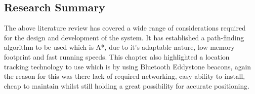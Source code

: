 \subsection{Research Summary}
The above literature review has covered a wide range of considerations required for the design and development of the system. It has established a path-finding algorithm to be used which is A*, due to it's adaptable nature, low memory footprint and fast running speeds. This chapter also highlighted a location tracking technology to use which is by using Bluetooth Eddystone beacons, again the reason for this was there lack of required networking, easy ability to install, cheap to maintain whilst still holding a great possibility for accurate positioning. 
